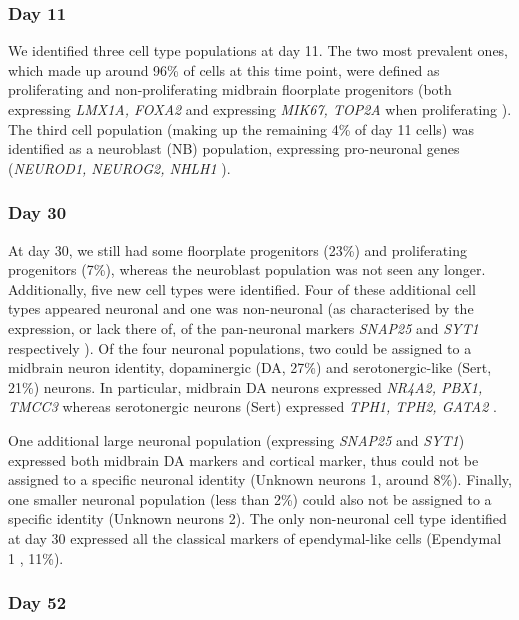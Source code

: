\subsubsection{Day 11}

We identified three cell type populations at day 11.
The two most prevalent ones, which made up around 96\% of cells at this time point, were defined as proliferating and non-proliferating midbrain floorplate progenitors (both expressing \textit{LMX1A, FOXA2} and expressing \textit{MIK67, TOP2A} when proliferating \cite{la2016molecular}).
The third cell population (making up the remaining 4\% of day 11 cells) was identified as a neuroblast (NB) population,  expressing pro-neuronal genes (\textit{NEUROD1, NEUROG2, NHLH1} \cite{bertrand2002proneural, lacomme2012neurog2}).

\subsubsection{Day 30}

At day 30, we still had some floorplate progenitors (23\%) and proliferating progenitors (7\%), whereas the neuroblast population was not seen any longer.
Additionally, five new cell types were identified.
Four of these additional cell types appeared neuronal and one was non-neuronal (as characterised by the expression, or lack there of, of the pan-neuronal markers \textit{SNAP25} and \textit{SYT1} respectively \cite{arenas2015make}). 
Of the four neuronal populations, two could be assigned to a midbrain neuron identity, dopaminergic (DA, 27\%) and serotonergic-like (Sert, 21\%) neurons.
In particular, midbrain DA neurons expressed \textit{NR4A2, PBX1, TMCC3} \cite{la2016molecular, park2006acquisition, ramonet2012park9} whereas serotonergic neurons (Sert) expressed \textit{TPH1, TPH2, GATA2} \cite{cummings2019serotonergic}. 

One additional large neuronal population (expressing \textit{SNAP25} and \textit{SYT1}) expressed both midbrain DA markers and cortical marker, thus could not be assigned to a specific neuronal identity (Unknown neurons 1, around 8\%).
Finally, one smaller neuronal population (less than 2\%) could also not be assigned to a specific identity (Unknown neurons 2). 
The only non-neuronal cell type identified at day 30 expressed all the classical markers of ependymal-like cells (Ependymal 1 \cite{campbell2017molecular}, 11\%). 

\subsubsection{Day 52}

